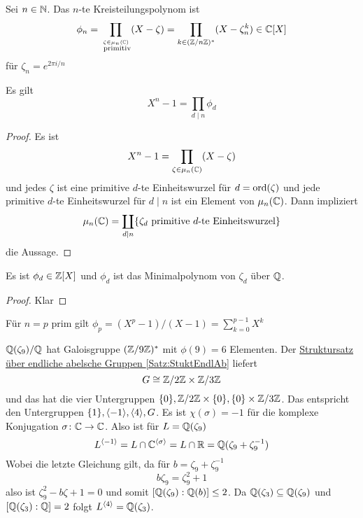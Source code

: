 \begin{Def}
    Sei \(n\in\mathbb{N}\). Das \(n\)-te Kreisteilungspolynom ist \[\phi_n=\prod_{\stackrel{\zeta\in\mu_n(\mathbb{C})}{\text{ primitiv}}}(X-\zeta)=\prod_{k\in(\mathbb{Z}/n\mathbb{Z})^*}(X-\zeta_n^k)\in\mathbb{C}[X]\] für \(\zeta_n=e^{2\pi i/n}\)
\end{Def}
\begin{Lemma}
Es gilt    \[X^n-1=\prod_{d\mid n}\phi_d\]
\end{Lemma}
\begin{proof}
   Es ist \[X^n-1=\prod_{\zeta\in\mu_n(\mathbb{C})}(X-\zeta)\] und jedes \(\zeta\) ist eine primitive \(d\)-te Einheitswurzel für \(d=\operatorname{ord}(\zeta)\) und jede primitive \(d\)-te Einheitswurzel für \(d\mid n\) ist ein Element von \(\mu_n(\mathbb{C})\).
    Dann impliziert \[\mu_n(\mathbb{C})=\coprod_{d\mid n}\{\zeta_d \text{ primitive \(d\)-te Einheitswurzel}\}\] die Aussage.
\end{proof}
\begin{Lemma}
 Es ist \(\phi_d\in\mathbb{Z}[X]\) und \(\phi_d\) ist das Minimalpolynom von \(\zeta_d\) über \(\mathbb{Q}\).
\end{Lemma}
\begin{proof}
    Klar
\end{proof}
\begin{Bem}
    Für \(n=p\) prim gilt \(\phi_p=(X^p-1)/(X-1)=\sum\limits_{k=0}^{p-1}X^k\)
\end{Bem}
\begin{Bsp}
    \(\mathbb{Q}(\zeta_9)/\mathbb{Q}\) hat Galoisgruppe \((\mathbb{Z}/9\mathbb{Z})^*\) mit \(\phi(9)=6\) Elementen. Der \hyperref[Satz:StuktEndlAb]{Struktursatz über endliche abelsche Gruppen \ref{Satz:StuktEndlAb}} liefert \[G\cong \mathbb{Z}/2\mathbb{Z}\times \mathbb{Z}/3\mathbb{Z}\] und das hat die vier Untergruppen \(\{0\},\mathbb{Z}/2\mathbb{Z}\times\{0\}, \{0\}\times\mathbb{Z}/3\mathbb{Z}\).
    Das entspricht den Untergruppen \(\{1\}, \langle-1\rangle, \langle 4\rangle,G\).
    Es ist \(\chi(\sigma)=-1\) für die komplexe Konjugation \(\sigma\colon\mathbb{C}\to\mathbb{C}\). Also ist für \(L=\mathbb{Q}(\zeta_9)\)
    \[L^{\langle -1\rangle}=L\cap \mathbb{C}^{\langle \sigma\rangle}=L\cap\mathbb{R}=\mathbb{Q}(\zeta_9+\zeta_9^{-1})\]
    Wobei die letzte Gleichung gilt, da für \(b=\zeta_9+\zeta_9^{-1}\)
    \[b\zeta_9=\zeta_9^2+1\] also ist \(\zeta_9^2-b\zeta+1=0\) und somit \([\mathbb{Q}(\zeta_9):\mathbb{Q}(b)]\leq 2\).
    Da \(\mathbb{Q}(\zeta_3)\subseteq \mathbb{Q}(\zeta_9)\) und \([\mathbb{Q}(\zeta_3):\mathbb{Q}]=2\) folgt \(L^{\langle 4\rangle}=\mathbb{Q}(\zeta_3)\).
\end{Bsp}
